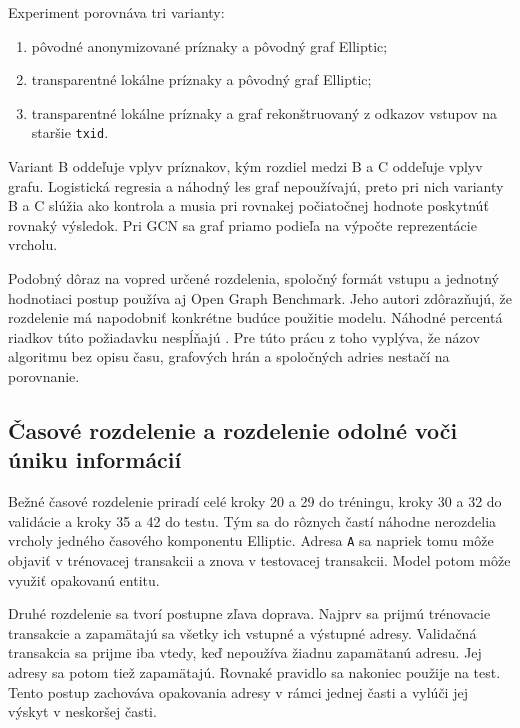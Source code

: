Experiment porovnáva tri varianty:
\begin{enumerate}[label=\Alph*.]
  \item pôvodné anonymizované príznaky a pôvodný graf Elliptic;
  \item transparentné lokálne príznaky a pôvodný graf Elliptic;
  \item transparentné lokálne príznaky a graf rekonštruovaný z odkazov
  vstupov na staršie \texttt{txid}.
\end{enumerate}

Variant B oddeľuje vplyv príznakov, kým rozdiel medzi B a C oddeľuje
vplyv grafu. Logistická regresia a náhodný les graf nepoužívajú, preto
pri nich varianty B a C slúžia ako kontrola a musia pri rovnakej
počiatočnej hodnote
poskytnúť rovnaký výsledok. Pri GCN sa graf priamo podieľa na výpočte
reprezentácie vrcholu.

Podobný dôraz na vopred určené rozdelenia, spoločný formát vstupu a
jednotný hodnotiaci postup používa aj Open Graph Benchmark. Jeho
autori zdôrazňujú, že rozdelenie má napodobniť konkrétne budúce
použitie modelu. Náhodné percentá riadkov túto požiadavku nespĺňajú
\cite{hu2020ogb}. Pre túto prácu z toho vyplýva, že názov algoritmu bez
opisu času, grafových hrán a spoločných adries nestačí na porovnanie.

\subsection{Časové rozdelenie a rozdelenie odolné voči úniku informácií}

Bežné časové rozdelenie priradí celé kroky 20 a 29 do tréningu, kroky
30 a 32 do validácie a kroky 35 a 42 do testu. Tým sa do rôznych častí
náhodne nerozdelia vrcholy jedného časového komponentu Elliptic. Adresa
\texttt{A} sa napriek tomu môže objaviť v trénovacej
transakcii a znova v testovacej transakcii. Model potom môže využiť
opakovanú entitu.

Druhé rozdelenie sa tvorí postupne zľava doprava. Najprv sa prijmú
trénovacie transakcie a zapamätajú sa všetky ich vstupné a výstupné
adresy. Validačná transakcia sa prijme iba vtedy, keď nepoužíva žiadnu
zapamätanú adresu. Jej adresy sa potom tiež zapamätajú. Rovnaké pravidlo
sa nakoniec použije na test. Tento postup zachováva opakovania adresy
v rámci jednej časti a vylúči jej výskyt v neskoršej časti.

